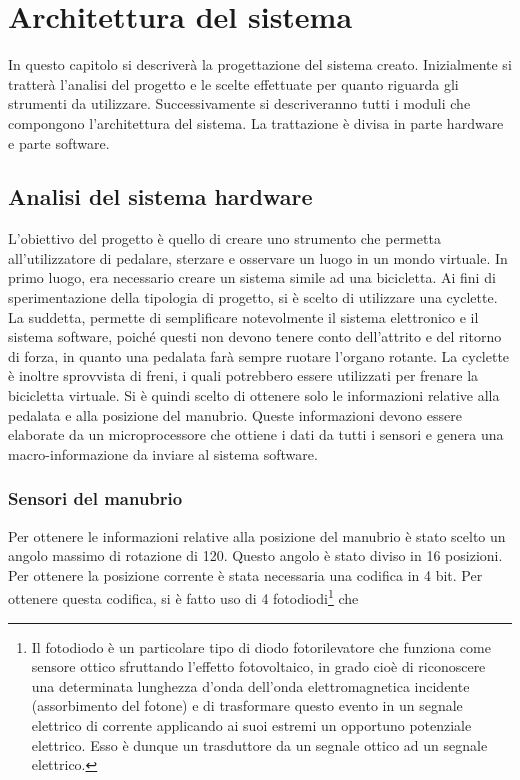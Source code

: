 \chapter{Architettura del sistema}
\label{capitolo3}
\thispagestyle{empty}

\noindent In questo capitolo si descriverà la progettazione del sistema creato. Inizialmente si tratterà l'analisi del progetto e le scelte effettuate per quanto riguarda gli strumenti da utilizzare. Successivamente si descriveranno tutti i moduli che compongono l'architettura del sistema. La trattazione è divisa in parte hardware e parte software.
\section{Analisi del sistema hardware}
L'obiettivo del progetto è quello di creare uno strumento che permetta all'utilizzatore di pedalare, sterzare e osservare un luogo in un mondo virtuale. In primo luogo, era necessario creare un sistema simile ad una bicicletta. Ai fini di sperimentazione della tipologia di progetto, si è scelto di utilizzare una cyclette. La suddetta, permette di semplificare notevolmente il sistema elettronico e il sistema software, poiché questi non devono tenere conto dell'attrito e del ritorno di forza, in quanto una pedalata farà sempre ruotare l'organo rotante. La cyclette è inoltre sprovvista di freni, i quali potrebbero essere utilizzati per frenare la bicicletta virtuale. Si è quindi scelto di ottenere solo le informazioni relative alla pedalata e alla posizione del manubrio. Queste informazioni devono essere elaborate da un microprocessore che ottiene i dati da tutti i sensori e genera una macro-informazione da inviare al sistema software.
\subsection{Sensori del manubrio}
Per ottenere le informazioni relative alla posizione del manubrio è stato scelto un angolo massimo di rotazione di 120\degree. Questo angolo è stato diviso in 16 posizioni. Per ottenere la posizione corrente è stata necessaria una codifica in 4 bit. Per ottenere questa codifica, si è fatto uso di 4 fotodiodi\footnote{Il fotodiodo è un particolare tipo di diodo fotorilevatore che funziona come sensore ottico sfruttando l'effetto fotovoltaico, in grado cioè di riconoscere una determinata lunghezza d'onda dell'onda elettromagnetica incidente (assorbimento del fotone) e di trasformare questo evento in un segnale elettrico di corrente applicando ai suoi estremi un opportuno potenziale elettrico. Esso è dunque un trasduttore da un segnale ottico ad un segnale elettrico.} che 